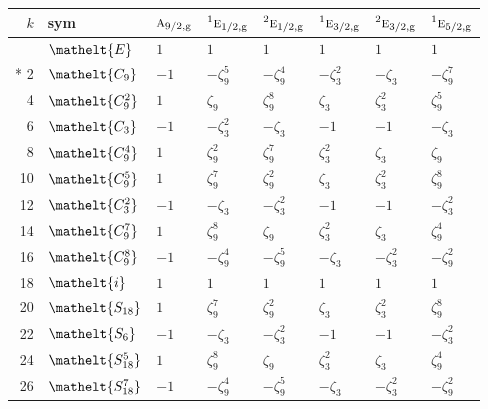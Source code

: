 \documentclass[10pt,a4paper]{article}
\numberwithin{equation}{section}
\newcommand{\eltfont}[1]{{\let\sigma\eltsigma\mathelt{#1}}}
\newcommand{\irr}[1]{\text{\normalfont\scshape #1}}
\newcommand{\conjpair}[1]{{}^{#1}}
\newcommand{\cls}[1]{\eltfont{#1}}
\newcommand{\ptag}[1]{\mathrm{#1}}
\newcommand{\rootunity}[1]{\zeta_{#1}}
\begin{document}
{\small\setlength{\tabcolsep}{4pt}
\begin{longtable}{@{}rlllllll@{}}\toprule
$k$ & sym & $\irr{a}_{9/2,\ptag{g}}$ & $\conjpair{1}\irr{e}_{1/2,\ptag{g}}$ & $\conjpair{2}\irr{e}_{1/2,\ptag{g}}$ & $\conjpair{1}\irr{e}_{3/2,\ptag{g}}$ & $\conjpair{2}\irr{e}_{3/2,\ptag{g}}$ & $\conjpair{1}\irr{e}_{5/2,\ptag{g}}$\\\midrule\endhead
\bottomrule\endfoot\endlastfoot
0 & $\cls{E}$ & $1$ & $1$ & $1$ & $1$ & $1$ & $1$\\*
2 & $\cls{C_{9}}$ & $-1$ & $-\rootunity{9}^{5}$ & $-\rootunity{9}^{4}$ & $-\rootunity{3}^{2}$ & $-\rootunity{3}$ & $-\rootunity{9}^{7}$\\
4 & $\cls{C_{9}^{2}}$ & $1$ & $\rootunity{9}$ & $\rootunity{9}^{8}$ & $\rootunity{3}$ & $\rootunity{3}^{2}$ & $\rootunity{9}^{5}$\\
6 & $\cls{C_{3}}$ & $-1$ & $-\rootunity{3}^{2}$ & $-\rootunity{3}$ & $-1$ & $-1$ & $-\rootunity{3}$\\
8 & $\cls{C_{9}^{4}}$ & $1$ & $\rootunity{9}^{2}$ & $\rootunity{9}^{7}$ & $\rootunity{3}^{2}$ & $\rootunity{3}$ & $\rootunity{9}$\\
10 & $\cls{C_{9}^{5}}$ & $1$ & $\rootunity{9}^{7}$ & $\rootunity{9}^{2}$ & $\rootunity{3}$ & $\rootunity{3}^{2}$ & $\rootunity{9}^{8}$\\
12 & $\cls{C_{3}^{2}}$ & $-1$ & $-\rootunity{3}$ & $-\rootunity{3}^{2}$ & $-1$ & $-1$ & $-\rootunity{3}^{2}$\\
14 & $\cls{C_{9}^{7}}$ & $1$ & $\rootunity{9}^{8}$ & $\rootunity{9}$ & $\rootunity{3}^{2}$ & $\rootunity{3}$ & $\rootunity{9}^{4}$\\
16 & $\cls{C_{9}^{8}}$ & $-1$ & $-\rootunity{9}^{4}$ & $-\rootunity{9}^{5}$ & $-\rootunity{3}$ & $-\rootunity{3}^{2}$ & $-\rootunity{9}^{2}$\\
18 & $\cls{i}$ & $1$ & $1$ & $1$ & $1$ & $1$ & $1$\\
20 & $\cls{S_{18}}$ & $1$ & $\rootunity{9}^{7}$ & $\rootunity{9}^{2}$ & $\rootunity{3}$ & $\rootunity{3}^{2}$ & $\rootunity{9}^{8}$\\
22 & $\cls{S_{6}}$ & $-1$ & $-\rootunity{3}$ & $-\rootunity{3}^{2}$ & $-1$ & $-1$ & $-\rootunity{3}^{2}$\\
24 & $\cls{S_{18}^{5}}$ & $1$ & $\rootunity{9}^{8}$ & $\rootunity{9}$ & $\rootunity{3}^{2}$ & $\rootunity{3}$ & $\rootunity{9}^{4}$\\
26 & $\cls{S_{18}^{7}}$ & $-1$ & $-\rootunity{9}^{4}$ & $-\rootunity{9}^{5}$ & $-\rootunity{3}$ & $-\rootunity{3}^{2}$ & $-\rootunity{9}^{2}$\\

\end{longtable}}
\end{document}
